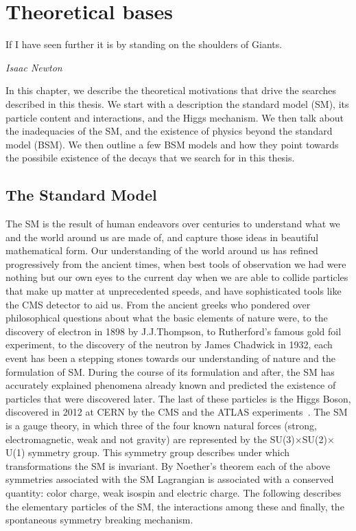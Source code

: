 %
%

\chapter{Theoretical bases}
\label{chap:theory}
\epigraph{If I have seen further it is by standing on the shoulders of Giants.}{\textit{Isaac Newton}}
In this chapter, we describe the theoretical motivations that drive the searches described in this thesis. We start with a description  the standard model (SM), its particle content and interactions, and the Higgs mechanism. We then talk about the inadequacies of the SM, and the existence of physics beyond the standard model (BSM). We then outline a few BSM models and how they point towards the possibile existence of the decays that we search for in this thesis.  

\section{The Standard Model }
\label{sec:SM}
The SM is the result of human endeavors over centuries to understand what we and the world around us are made of, and capture those ideas in beautiful mathematical form. Our understanding of the world around us has refined progressively from the ancient times, when best tools of observation we had were nothing but our own eyes to the current day when we are able to collide particles that make up matter at unprecedented speeds, and have sophisticated tools like the CMS detector to aid us. From the ancient greeks who pondered over philosophical questions about what the basic elements of nature were, to the discovery of electron in 1898 by J.J.Thompson, to Rutherford's famous gold foil experiment, to the discovery of the neutron by James Chadwick in 1932, each event has been a stepping stones towards our understanding of nature and the formulation of SM. During the course of its formulation and after, the SM has accurately explained phenomena already known and  predicted the existence of particles that were discovered later. The last of these particles is the Higgs Boson, discovered in 2012 at CERN by the CMS and the ATLAS experiments~\cite{Aad:2012tfa, Chatrchyan:2012ufa, Chatrchyan:2013lba}. The SM is a gauge theory, in which three of the four known natural forces (strong, electromagnetic, weak and not gravity) are represented by the SU(3)$\times$SU(2)$\times$U(1) symmetry group. This symmetry group describes under which transformations the SM is invariant. By Noether's theorem each of the above symmetries associated with the SM Lagrangian is associated with a conserved quantity: color charge, weak isospin and electric charge. The following describes the elementary particles of the SM, the interactions among these and finally, the spontaneous symmetry breaking mechanism.

